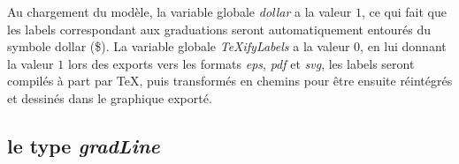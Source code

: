 Au chargement du modèle, la variable globale \emph{dollar} a la valeur $1$, ce qui fait que les labels correspondant aux graduations seront automatiquement entourés du symbole dollar (\$). La variable globale \emph{TeXifyLabels} a la valeur $0$, en lui donnant la valeur $1$ lors des exports vers les formats \textit{eps}, \textit{pdf} et \textit{svg}, les labels seront compilés à part par TeX, puis transformés en chemins pour être ensuite réintégrés et dessinés dans le graphique exporté.

\subsection{le type \emph{gradLine}}\label{typegradline}

{\centering {}\par}

